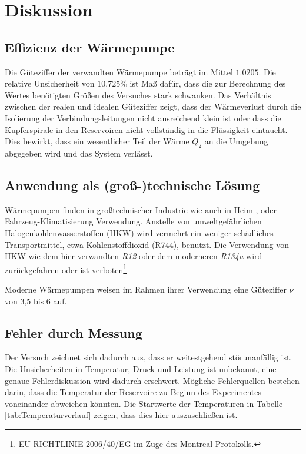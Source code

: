 \section{Diskussion}
\label{sec:Diskussion}
\subsection{Effizienz der Wärmepumpe}
Die Güteziffer der verwandten Wärmepumpe beträgt im Mittel $1.0205$.
Die relative Unsicherheit von $10.725\%$ ist Maß dafür, dass die zur Berechnung des Wertes benötigten Größen des Versuches stark schwanken.
Das Verhältnis zwischen der realen und idealen Güteziffer zeigt, dass 
der Wärmeverlust durch die Isolierung der Verbindungsleitungen nicht ausreichend klein ist oder dass die Kupferspirale in den Reservoiren nicht vollständig in die Flüssigkeit eintaucht.
Dies bewirkt, dass ein wesentlicher Teil der Wärme $Q_2$ an die Umgebung abgegeben wird und das System verlässt.

\subsection{Anwendung als (groß-)technische Lösung}
Wärmepumpen finden in großtechnischer Industrie wie auch in Heim-, oder Fahrzeug-Klimatisierung Verwendung. 
Anstelle von umweltgefährlichen Halogenkohlenwasserstoffen (HKW) wird vermehrt ein weniger schädliches Transportmittel, etwa Kohlenstoffdioxid (R744), benutzt. 
Die Verwendung von HKW\cite{kaeltemittel} wie dem hier verwandten \textit{R12} oder dem moderneren \textit{R134a}\cite{viessmann_VITOCAL161A} wird zurückgefahren oder ist verboten\footnote{EU-RICHTLINIE 2006/40/EG im Zuge des Montreal-Protokolls.}

\noindent Moderne Wärmepumpen weisen im Rahmen ihrer Verwendung eine Güteziffer $\nu$ von 3,5 bis 6 auf\cite{viessmann_VITOCAL300G}.

\subsection{Fehler durch Messung}
Der Versuch zeichnet sich dadurch aus, dass er weitestgehend störunanfällig ist.
Die Unsicherheiten in Temperatur, Druck und Leistung ist unbekannt, eine genaue Fehlerdiskussion wird dadurch erschwert.
Mögliche Fehlerquellen bestehen darin, dass die Temperatur der Reservoire zu Beginn des Experimentes voneinander abweichen könnten.
Die Startwerte der Temperaturen in Tabelle \ref{tab:Temperaturverlauf} zeigen, dass dies hier auszuschließen ist.

